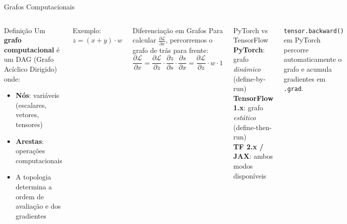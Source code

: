\documentclass[7pt, aspectratio=169,10pt]{beamer}
\newcommand{\pdiff}[2]{\frac{\partial #1}{\partial #2}}
\begin{document}
\begin{frame}{Grafos Computacionais}
\begin{columns}[T]
\begin{block}{Definição}
\small
Um \textbf{grafo computacional} é um DAG (Grafo Acíclico Dirigido) onde:
\begin{itemize}
  \item \textbf{Nós}: variáveis (escalares, vetores, tensores)
  \item \textbf{Arestas}: operações computacionais
  \item A topologia determina a ordem de avaliação e dos gradientes
\end{itemize}
\end{block}
\begin{exampleblock}{Exemplo: $z = (x+y)\cdot w$}
\end{exampleblock}
\begin{block}{Diferenciação em Grafos}
\small
Para calcular $\pdiff{\mathcal{L}}{x}$, percorremos o grafo de trás para frente:
\[
\pdiff{\mathcal{L}}{x} = \pdiff{\mathcal{L}}{z}\cdot\pdiff{z}{s}\cdot\pdiff{s}{x}
= \pdiff{\mathcal{L}}{z}\cdot w \cdot 1
\]
\end{block}
\begin{alertblock}{PyTorch vs TensorFlow}
\small
\textbf{PyTorch}: grafo \textit{dinâmico} (define-by-run)\\
\textbf{TensorFlow 1.x}: grafo \textit{estático} (define-then-run)\\
\textbf{TF 2.x / JAX}: ambos modos disponíveis
\end{alertblock}
\begin{block}{}
\small
\texttt{tensor.backward()} em PyTorch percorre automaticamente o grafo e acumula gradientes em \texttt{.grad}.
\end{block}
\end{columns}
\end{frame}
\end{document}
